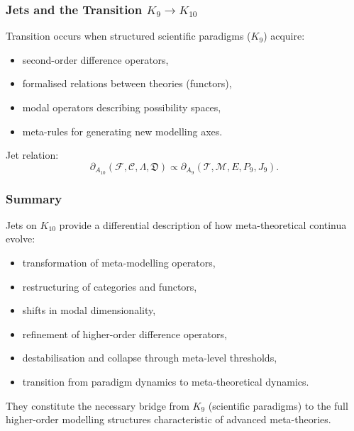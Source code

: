 \subsubsection{Jets and the Transition $K_9 \to K_{10}$}

Transition occurs when structured scientific paradigms ($K_9$) acquire:
\begin{itemize}
    \item second-order difference operators,
    \item formalised relations between theories (functors),
    \item modal operators describing possibility spaces,
    \item meta-rules for generating new modelling axes.
\end{itemize}

Jet relation:
\[
\partial_{A_{10}}(\mathcal{F},\mathcal{C},\Lambda,\mathfrak{D})
\propto
\partial_{A_9}(\mathcal{T},\mathcal{M},E,P_9,J_9).
\]


\subsubsection{Summary}

Jets on $K_{10}$ provide a differential description of how
meta-theoretical continua evolve:
\begin{itemize}
    \item transformation of meta-modelling operators,
    \item restructuring of categories and functors,
    \item shifts in modal dimensionality,
    \item refinement of higher-order difference operators,
    \item destabilisation and collapse through meta-level thresholds,
    \item transition from paradigm dynamics to meta-theoretical dynamics.
\end{itemize}

They constitute the necessary bridge from $K_9$ (scientific paradigms) to
the full higher-order modelling structures characteristic of advanced
meta-theories.
